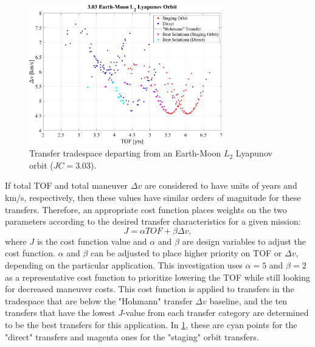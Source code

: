 \begin{figure}[ht]
    \centering
    \includegraphics[width=0.75\textwidth]{figures/TradeSpace_L2Lyapunov_3_03.pdf}
    \caption{Transfer tradespace departing from an Earth-Moon $L_{2}$ Lyapunov orbit ($JC=3.03$).}
    \label{fig:lowDeltav}
\end{figure}

If total TOF and total maneuver $\Delta v$ are considered to have units of years and km/s,
respectively, then these values have similar orders of magnitude for these transfers. Therefore, an
appropriate cost function places weights on the two parameters according to the desired transfer
characteristics for a given mission:
\begin{equation}
    J=\alpha TOF+\beta\Delta v,
    \label{eq:costfunction}
\end{equation}
where $J$ is the cost function value and $\alpha$ and $\beta$ are design variables to adjust the
cost function. $\alpha$ and $\beta$ can be adjusted to place higher priority on TOF or $\Delta v$,
depending on the particular application. This investigation uses $\alpha=5$ and $\beta=2$ as a
representative cost function to prioritize lowering the TOF while still looking for decreased
maneuver costs. This cost function is applied to transfers in the tradespace that are below the
"Hohmann" transfer $\Delta v$ baseline, and the ten transfers that have the lowest $J$-value from
each transfer category are determined to be the best transfers for this application. In
\cref{fig:lowDeltav}, these are cyan points for the "direct" transfers and magenta ones for the
"staging" orbit transfers.

